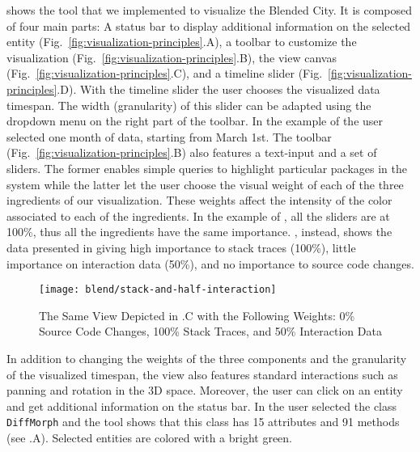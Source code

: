  shows the tool that we implemented to visualize the Blended City.
It is composed of four main parts: A status bar to display additional information on the selected entity (Fig.~\ref{fig:visualization-principles}.A), a toolbar to customize the visualization (Fig.~\ref{fig:visualization-principles}.B), the view canvas (Fig.~\ref{fig:visualization-principles}.C), and a timeline slider (Fig.~\ref{fig:visualization-principles}.D).
With the timeline slider the user chooses the visualized data timespan.
The width (\ie granularity) of this slider can be adapted using the dropdown menu on the right part of the toolbar.
In the example of  the user selected one month of data, starting from March 1st.
 The toolbar (Fig.~\ref{fig:visualization-principles}.B) also features a text-input and a set of sliders.
The former enables simple queries to highlight particular packages in the system while the latter let the user choose the visual weight of each of the three ingredients of our visualization.
These weights affect the intensity of the color associated to each of the ingredients.
In the example of , all the sliders are at 100\%, thus all the ingredients have the same importance.
, instead, shows the data presented in  giving high importance to stack traces (100\%), little importance on interaction data (50\%), and no importance to source code changes.

\begin{figure}[ht]
\centering
\texttt{[image: blend/stack-and-half-interaction]}
\caption{The Same View Depicted in .C with the Following Weights: 0\% Source Code Changes, 100\% Stack Traces, and 50\% Interaction Data}
\label{fig:stack-and-half-interaction}
\end{figure}

In addition to changing the weights of the three components and the granularity of the visualized timespan, the view also features standard interactions such as panning and rotation in the 3D space.
Moreover, the user can click on an entity and get additional information on the status bar.
In  the user selected the class \texttt{DiffMorph} and the tool shows that this class has 15 attributes and 91 methods (see .A).
Selected entities are colored with a bright green.


